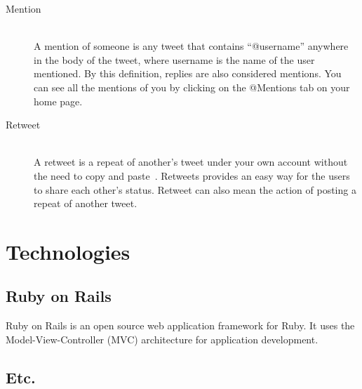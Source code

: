 \begin{description}
\item[Mention] \hfill \\
 A mention of someone is any tweet that
  contains ``@username'' anywhere in the body of the tweet, where
  username is the name of the user mentioned. By this definition,
  replies are also considered mentions. You can see all the mentions
  of you by clicking on the @Mentions tab on your home page.

\item[Retweet] \hfill \\
A retweet is a repeat of another’s tweet under
  your own account without the need to copy and paste~\cite{morris09}.
  Retweets provides an easy way for the users to share each other's
  status. Retweet can also mean the action of posting a repeat of
  another tweet.

\end{description}

\section{Technologies}

\subsection{Ruby on Rails} %
\label{sub:ruby_on_rails}

Ruby on Rails is an open source web application framework for Ruby. It uses the Model-View-Controller (MVC) architecture for application development.

\subsection{Etc.}


